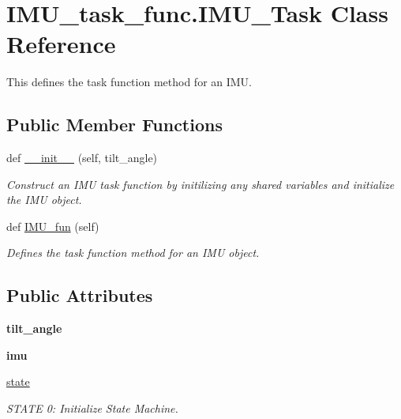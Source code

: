 \hypertarget{classIMU__task__func_1_1IMU__Task}{}\section{I\+M\+U\+\_\+task\+\_\+func.\+I\+M\+U\+\_\+\+Task Class Reference}
\label{classIMU__task__func_1_1IMU__Task}


This defines the task function method for an I\+MU.  


\subsection*{Public Member Functions}
\begin{DoxyCompactItemize}
\item 
def \hyperlink{classIMU__task__func_1_1IMU__Task_a1567b8075b1b37122d16acc01bc87da6}{\+\_\+\+\_\+init\+\_\+\+\_\+} (self, tilt\+\_\+angle)
\begin{DoxyCompactList}\small\item\em Construct an I\+MU task function by initilizing any shared variables and initialize the I\+MU object. \end{DoxyCompactList}\item 
def \hyperlink{classIMU__task__func_1_1IMU__Task_a7a222352bd6595871941fa2985c0b652}{I\+M\+U\+\_\+fun} (self)\hypertarget{classIMU__task__func_1_1IMU__Task_a7a222352bd6595871941fa2985c0b652}{}\label{classIMU__task__func_1_1IMU__Task_a7a222352bd6595871941fa2985c0b652}

\begin{DoxyCompactList}\small\item\em Defines the task function method for an I\+MU object. \end{DoxyCompactList}\end{DoxyCompactItemize}
\subsection*{Public Attributes}
\begin{DoxyCompactItemize}
\item 
{\bfseries tilt\+\_\+angle}\hypertarget{classIMU__task__func_1_1IMU__Task_a55dc83aea265bc0662cc1cb2e2f84743}{}\label{classIMU__task__func_1_1IMU__Task_a55dc83aea265bc0662cc1cb2e2f84743}

\item 
{\bfseries imu}\hypertarget{classIMU__task__func_1_1IMU__Task_a39088aba51fefae785a075109af0195f}{}\label{classIMU__task__func_1_1IMU__Task_a39088aba51fefae785a075109af0195f}

\item 
\hyperlink{classIMU__task__func_1_1IMU__Task_ab0d43e6f1c7383062cbe178648b51225}{state}
\begin{DoxyCompactList}\small\item\em S\+T\+A\+TE 0\+: Initialize State Machine. \end{DoxyCompactList}\end{DoxyCompactItemize}


